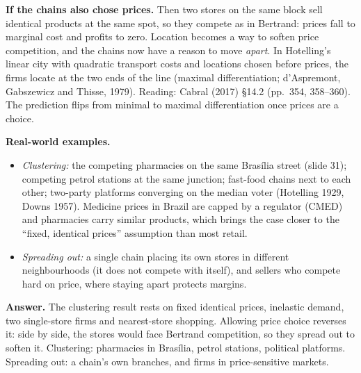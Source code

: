 \documentclass[11pt,a4paper]{article}
\newcommand{\answer}[1]{\begin{tcolorbox}[colback=ans!5,colframe=ans,boxrule=0.6pt,
  left=5pt,right=5pt,top=3pt,bottom=3pt]\textbf{Answer.} #1\end{tcolorbox}}
\begin{document}
\textbf{If the chains also chose prices.} Then two stores on the same block sell identical
products at the same spot, so they compete as in Bertrand: prices fall to marginal cost and
profits to zero. Location becomes a way to soften price competition, and the chains now have a
reason to move \emph{apart}. In Hotelling's linear city with quadratic transport costs and
locations chosen before prices, the firms locate at the two ends of the line (maximal
differentiation; d'Aspremont, Gabszewicz and Thisse, 1979). Reading: Cabral (2017) \S14.2
(pp.~354, 358--360). The prediction flips from minimal to maximal differentiation once prices
are a choice.

\textbf{Real-world examples.}
\begin{itemize}
  \item \emph{Clustering:} the competing pharmacies on the same Brasília street (slide 31);
        competing petrol stations at the same junction; fast-food chains next to each other;
        two-party platforms converging on the median voter (Hotelling 1929, Downs 1957). Medicine
        prices in Brazil are capped by a regulator (CMED) and pharmacies carry similar products,
        which brings the case closer to the ``fixed, identical prices'' assumption than most
        retail.
  \item \emph{Spreading out:} a single chain placing its own stores in different neighbourhoods
        (it does not compete with itself), and sellers who compete hard on price, where staying
        apart protects margins.
\end{itemize}

\answer{The clustering result rests on fixed identical prices, inelastic demand, two single-store
firms and nearest-store shopping. Allowing price choice reverses it: side by side, the stores
would face Bertrand competition, so they spread out to soften it. Clustering: pharmacies in
Brasília, petrol stations, political platforms. Spreading out: a chain's own branches, and firms
in price-sensitive markets.}
\end{document}
